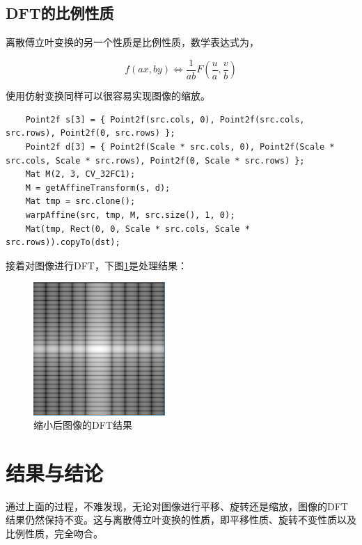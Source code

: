 \documentclass[hyperref,UTF8]{ctexart}
\begin{document}
\subsection{DFT的比例性质}

离散傅立叶变换的另一个性质是比例性质，数学表达式为，

\begin{equation}
f(ax,by) \Leftrightarrow \frac{1}{ab}F(\frac{u}{a},\frac{v}{b})
\end{equation}

使用仿射变换同样可以很容易实现图像的缩放。

\begin{lstlisting}
	Point2f s[3] = { Point2f(src.cols, 0), Point2f(src.cols, src.rows), Point2f(0, src.rows) };
	Point2f d[3] = { Point2f(Scale * src.cols, 0), Point2f(Scale * src.cols, Scale * src.rows), Point2f(0, Scale * src.rows) };
	Mat M(2, 3, CV_32FC1);
	M = getAffineTransform(s, d);
	Mat tmp = src.clone();
	warpAffine(src, tmp, M, src.size(), 1, 0);
	Mat(tmp, Rect(0, 0, Scale * src.cols, Scale * src.rows)).copyTo(dst);
\end{lstlisting}


接着对图像进行DFT，下图\ref{fig:scaleDFT}是处理结果：

\begin{figure}[H]
\centering
\includegraphics[width=5cm]{scaleDFT.PNG}
\caption{缩小后图像的DFT结果}
\label{fig:scaleDFT}
\end{figure}


\section{结果与结论}

通过上面的过程，不难发现，无论对图像进行平移、旋转还是缩放，图像的DFT结果仍然保持不变。这与离散傅立叶变换的性质，即平移性质、旋转不变性质以及比例性质，完全吻合。


\end{document}
